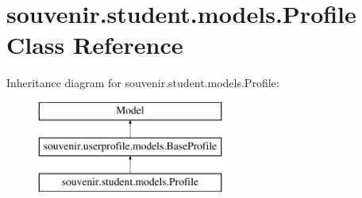 \hypertarget{classsouvenir_1_1student_1_1models_1_1Profile}{\section{souvenir.\-student.\-models.\-Profile Class Reference}
\label{classsouvenir_1_1student_1_1models_1_1Profile}
}
Inheritance diagram for souvenir.\-student.\-models.\-Profile\-:\begin{figure}[H]
\begin{center}
\leavevmode
\includegraphics[height=3.000000cm]{classsouvenir_1_1student_1_1models_1_1Profile}
\end{center}
\end{figure}
